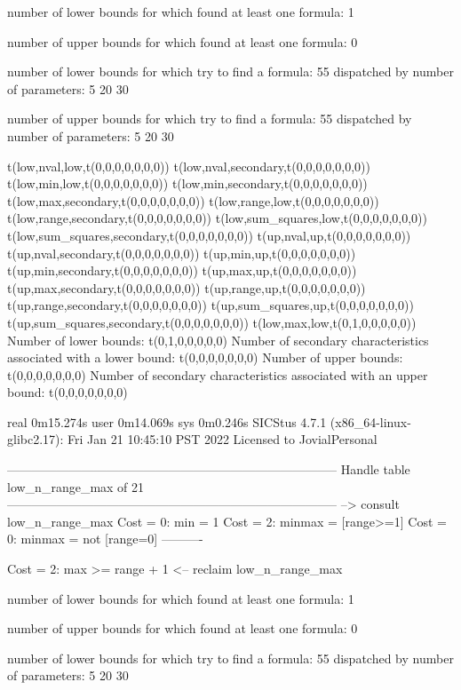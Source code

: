 number of lower bounds for which found at least one formula: 1

number of upper bounds for which found at least one formula: 0

number of lower bounds for which try to find a formula: 55
dispatched by number of parameters: 5  20  30

number of upper bounds for which try to find a formula: 55
dispatched by number of parameters: 5  20  30

t(low,nval,low,t(0,0,0,0,0,0,0))
t(low,nval,secondary,t(0,0,0,0,0,0,0))
t(low,min,low,t(0,0,0,0,0,0,0))
t(low,min,secondary,t(0,0,0,0,0,0,0))
t(low,max,secondary,t(0,0,0,0,0,0,0))
t(low,range,low,t(0,0,0,0,0,0,0))
t(low,range,secondary,t(0,0,0,0,0,0,0))
t(low,sum_squares,low,t(0,0,0,0,0,0,0))
t(low,sum_squares,secondary,t(0,0,0,0,0,0,0))
t(up,nval,up,t(0,0,0,0,0,0,0))
t(up,nval,secondary,t(0,0,0,0,0,0,0))
t(up,min,up,t(0,0,0,0,0,0,0))
t(up,min,secondary,t(0,0,0,0,0,0,0))
t(up,max,up,t(0,0,0,0,0,0,0))
t(up,max,secondary,t(0,0,0,0,0,0,0))
t(up,range,up,t(0,0,0,0,0,0,0))
t(up,range,secondary,t(0,0,0,0,0,0,0))
t(up,sum_squares,up,t(0,0,0,0,0,0,0))
t(up,sum_squares,secondary,t(0,0,0,0,0,0,0))
t(low,max,low,t(0,1,0,0,0,0,0))
Number of lower bounds:                                             t(0,1,0,0,0,0,0)
Number of secondary characteristics associated with a lower bound:  t(0,0,0,0,0,0,0)
Number of upper bounds:                                             t(0,0,0,0,0,0,0)
Number of secondary characteristics associated with an upper bound: t(0,0,0,0,0,0,0)

real	0m15.274s
user	0m14.069s
sys	0m0.246s
SICStus 4.7.1 (x86_64-linux-glibc2.17): Fri Jan 21 10:45:10 PST 2022
Licensed to JovialPersonal


--------------------------------------------------------------------------------
Handle table low_n_range_max of 21
--------------------------------------------------------------------------------
--> consult low_n_range_max
Cost =  0:  min    = 1
Cost =  2:  minmax = [range>=1]
Cost =  0:  minmax = not [range=0]
----------

Cost =  2:  max >= range + 1
<-- reclaim low_n_range_max

number of lower bounds for which found at least one formula: 1

number of upper bounds for which found at least one formula: 0

number of lower bounds for which try to find a formula: 55
dispatched by number of parameters: 5  20  30

